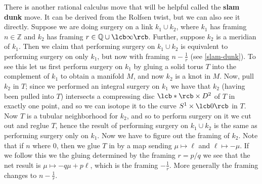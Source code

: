 There is another rational calculus move that will be helpful called the \textbf{slam dunk} move. It can be derived from the Rolfsen twist, but we can also see it directly. Suppose we are doing surgery on a link $k_1 \cup k_2$, where $k_1$ has framing $n \in \mathbb Z$ and $k_2$ has framing $r \in \mathbb Q \cup \lcb \infty \rcb$. Further, suppose $k_2$ is a meridian of $k_1$. Then we claim that performing surgery on $k_1 \cup k_2$ is equivalent to performing surgery on only $k_1$, but now with framing $n - \frac{1}{r}$ (see \cref{slam-dunk}). To see this let us first perform surgery on $k_1$ by gluing a solid torus $T$ into the complement of $k_1$ to obtain a manifold $M$, and now $k_2$ is a knot in $M$. Now, pull $k_2$ in $T$; since we performed an integral surgery on $k_1$ we have that $k_2$ (having been pulled into $T$) intersects a compressing disc $\lcb * \rcb \times D^2$  of $T$ in exactly one point, and so we can isotope it to the curve $S^1 \times \lcb 0 \rcb$ in $T$. Now $T$ is a tubular neighborhood for $k_2$, and so to perform surgery on it we cut out and reglue $T$, hence the result of performing surgery on $k_1 \cup k_2$ is the same as performing surgery only on $k_1$. Now we have to figure out the framing of $k_2$. Note that if $n$ where 0, then we glue $T$ in by a map sending $\mu \mapsto \ell$ and $\ell \mapsto -\mu$. If we follow this we the gluing determined by the framing $r=p/q$ we see that the net result is $\mu \mapsto -q\mu+p\ell$, which is the framing $-\frac{1}{r}$. More generally the framing changes to $n - \frac{1}{r}$.

